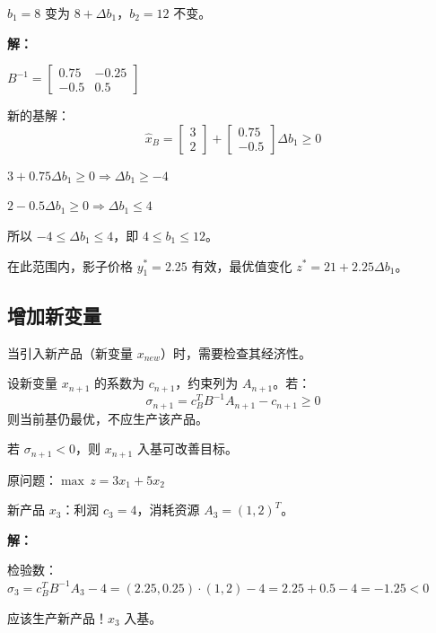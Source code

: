 \begin{example}[$b_i$ 灵敏度分析]
$b_1 = 8$ 变为 $8 + \Delta b_1$，$b_2 = 12$ 不变。

\textbf{解：}

$B^{-1} = \begin{bmatrix} 0.75 & -0.25 \\ -0.5 & 0.5 \end{bmatrix}$

新的基解：
\[
\hat{x}_B = \begin{bmatrix} 3 \\ 2 \end{bmatrix} + \begin{bmatrix} 0.75 \\ -0.5 \end{bmatrix} \Delta b_1 \geq 0
\]

$3 + 0.75\Delta b_1 \geq 0 \Rightarrow \Delta b_1 \geq -4$

$2 - 0.5\Delta b_1 \geq 0 \Rightarrow \Delta b_1 \leq 4$

所以 $-4 \leq \Delta b_1 \leq 4$，即 $4 \leq b_1 \leq 12$。

在此范围内，影子价格 $y_1^* = 2.25$ 有效，最优值变化 $z^* = 21 + 2.25\Delta b_1$。
\end{example}

\subsection{增加新变量}

当引入新产品（新变量 $x_{new}$）时，需要检查其经济性。

\begin{theorem}[新变量的检验]
设新变量 $x_{n+1}$ 的系数为 $c_{n+1}$，约束列为 $A_{n+1}$。若：
\[
\sigma_{n+1} = c_B^T B^{-1} A_{n+1} - c_{n+1} \geq 0
\]
则当前基仍最优，不应生产该产品。

若 $\sigma_{n+1} < 0$，则 $x_{n+1}$ 入基可改善目标。
\end{theorem}

\begin{example}[增加新变量]
原问题：$\max \, z = 3x_1 + 5x_2$

新产品 $x_3$：利润 $c_3 = 4$，消耗资源 $A_3 = (1, 2)^T$。

\textbf{解：}

检验数：$\sigma_3 = c_B^T B^{-1} A_3 - 4 = (2.25, 0.25) \cdot (1, 2) - 4 = 2.25 + 0.5 - 4 = -1.25 < 0$

应该生产新产品！$x_3$ 入基。
\end{example}

